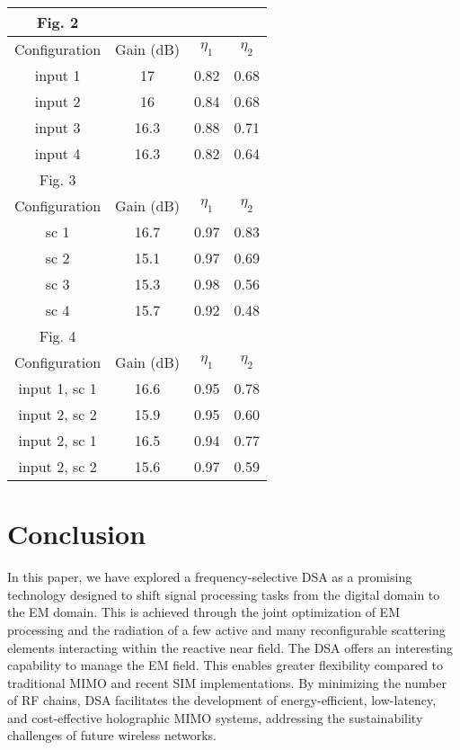 \documentclass[10pt, final, twocolumn, twoside, romanappendices]{IEEEtran}
\begin{document}
\begin{table}[tp]
\caption{}
\begin{center}
\begin{tabular}{|c|c|c|c|}
\hline
Fig. 2   \\
 \hline
 Configuration & Gain (dB) & $\eta_1$ & $\eta_2$ \\
 \hline
input 1   & 17 & 0.82 & 0.68 \\
input 2  & 16 & 0.84 & 0.68 \\ 
input 3 & 16.3 & 0.88 & 0.71 \\
input 4  & 16.3 & 0.82 & 0.64 \\
\hline
Fig. 3 \\
\hline
Configuration & Gain (dB) & $\eta_1$ & $\eta_2$ \\
 \hline
sc 1   & 16.7 & 0.97 & 0.83 \\
sc 2  & 15.1 & 0.97 & 0.69 \\ 
sc 3 & 15.3 & 0.98 & 0.56 \\
sc 4  & 15.7 & 0.92 & 0.48 \\
\hline
Fig. 4 \\
\hline
Configuration & Gain (dB) & $\eta_1$ & $\eta_2$ \\
 \hline
input 1, sc 1   & 16.6 & 0.95 & 0.78 \\
input 2, sc 2  & 15.9 & 0.95 & 0.60 \\ 
input 2, sc 1 & 16.5 & 0.94 & 0.77 \\
input 2, sc 2  & 15.6 & 0.97 & 0.59 \\
\hline
\end{tabular}
\end{center}
\label{Table:Cylinder}
\end{table}




\section{Conclusion}

In this paper, we have explored a frequency-selective \acf{DSA} as a promising technology designed to shift signal processing tasks from the digital domain to the \ac{EM} domain. This is achieved through the joint optimization of \ac{EM} processing and the radiation of a few active and many reconfigurable scattering elements interacting within the reactive near field.
%
The \ac{DSA} offers an interesting capability to manage the \ac{EM} field.
 This enables greater flexibility compared to traditional \ac{MIMO} and recent \ac{SIM} implementations. By minimizing the number of \ac{RF} chains, \ac{DSA} facilitates the development of energy-efficient, low-latency, and cost-effective holographic \ac{MIMO} systems, addressing the sustainability challenges of future wireless networks.
\end{document}
